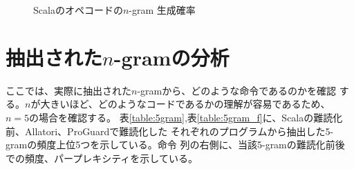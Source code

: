 \documentclass[12pt,twoside]{jreport}
\begin{document}
\begin{figure}[b]
  \centering
  \caption{Scalaのオペコードの$n$-gram 生成確率}\label{fig:scala-perplexity}
\end{figure}

\section{抽出された$n$-gramの分析}

ここでは、実際に抽出された$n$-gramから、どのような命令であるのかを確認
する。$n$が大きいほど、どのようなコードであるかの理解が容易であるため、
$n=5$の場合を確認する。
%
表\ref{table:5gram},表\ref{table:5gram_f}に、Scalaの難読化前、Allatori、ProGuardで難読化した
それぞれのプログラムから抽出した5-gramの頻度上位5つを示している。命令
列の右側に、当該5-gramの難読化前後での頻度、パープレキシティを示している。
\end{document}

